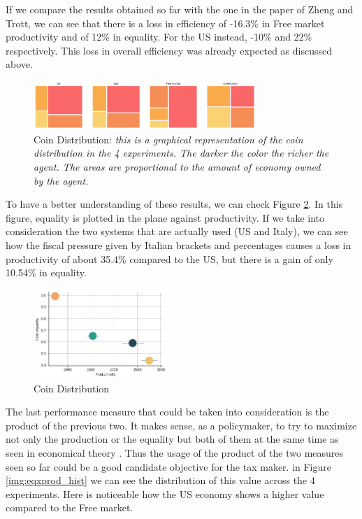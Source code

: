 If we compare the results obtained so far with the one in the paper of Zheng and Trott, we can see that there is a loss in efficiency of -16.3\% in Free market productivity and of 12\% in equality. For the US instead, -10\% and 22\% respectively. This loss in overall efficiency was already expected as discussed above.

\begin{figure}[h!]
    \centering
    \linespread{.9}
    \includegraphics[width=0.75\textwidth]{Resources/imgs/coin_distr.png}
    \caption[Coin Distribution]%
    {\label{img:coin_distribution}Coin Distribution: \small \textit{this is a graphical representation of the coin distribution in the 4 experiments. The darker the color the richer the agent. The areas are proportional to the amount of economy owned by the agent.}}
\end{figure}

To have a better understanding of these results, we can check Figure \ref{img:scatter}. In this figure, equality is plotted in the plane against productivity. If we take into consideration the two systems that are actually used (US and Italy), we can see how the fiscal pressure given by Italian brackets and percentages causes a loss in productivity of about 35.4\% compared to the US, but there is a gain of only 10.54\% in equality.

\begin{figure}[h!]
    \centering
    \includegraphics[width=0.45\textwidth]{Resources/imgs/scatter.png}
    \caption[Coin Distribution]%
    {\label{img:scatter}Coin Distribution \small \textit{}}
\end{figure}


The last performance measure that could be taken into consideration is the product of the previous two. It makes sense, as a policymaker, to try to maximize not only the production or the equality but both of them at the same time as seen in economical theory \cite{saez2001using}. Thus the usage of the product of the two measures seen so far could be a good candidate objective for the tax maker. in Figure \ref{img:eqxprod_hist} we can see the distribution of this value across the 4 experiments. Here is noticeable how the US economy shows a higher value compared to the Free market. 

